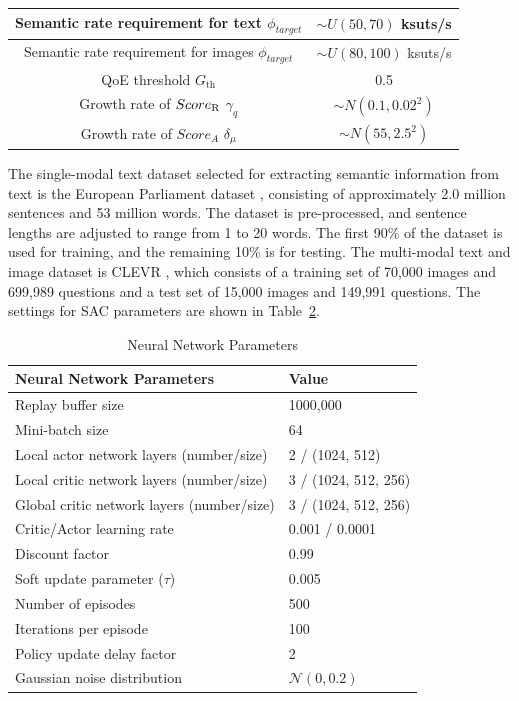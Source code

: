 \documentclass[10pt, lettersize,journal]{IEEEtran}
\begin{document}
\begin{table}[t]
\begin{center}
\begin{tabular}{|c|c|}
				Semantic rate requirement for text \( {\phi _{target}} \) & \( \sim U(50, 70) \) ksuts/s \\ \hline
				Semantic rate requirement for images \( {\phi _{target}} \) & \( \sim U(80, 100) \) ksuts/s \\ \hline
				QoE threshold \( G_{\text{th}} \) & 0.5 \\ \hline
				Growth rate of $Scor{e_{\rm{R}}}$ \( {\gamma _q} \) & \( \sim N(0.1, 0.02^2) \) \\ \hline
				Growth rate of $Scor{e_A}$ \( {\delta _\mu } \) & \( \sim N(55, 2.5^2) \) \\ \hline
			\end{tabular}
			\label{tab:vehicular_parameters}
		\end{center}
	\end{table}
	
	The single-modal text dataset selected for extracting semantic information from text is the European Parliament dataset \cite{RN91}, consisting of approximately 2.0 million sentences and 53 million words.
	The dataset is pre-processed, and sentence lengths are adjusted to range from 1 to 20 words. The first 90\% of the dataset is used for training, and the remaining 10\% is for testing.
	The multi-modal text and image dataset is CLEVR \cite{CLEVR}, which consists of a
	training set of 70,000 images and 699,989 questions and a test
	set of 15,000 images and 149,991 questions.
	The settings for SAC parameters are shown in Table~\ref{tab:neural_network_parameters}.
	\begin{table}[htbp]
		\centering
		\caption{Neural Network Parameters}
		\begin{tabular}{|l|l|}
			\hline
			\textbf{Neural Network Parameters} & \textbf{Value} \\ \hline
			Replay buffer size & 1000,000 \\ \hline
			Mini-batch size & 64 \\ \hline
			Local actor network layers (number/size) & 2 / (1024, 512) \\ \hline
			Local critic network layers (number/size) & 3 / (1024, 512, 256) \\ \hline
			Global critic network layers (number/size) & 3 / (1024, 512, 256) \\ \hline
			Critic/Actor learning rate & 0.001 / 0.0001 \\ \hline
			Discount factor & 0.99 \\ \hline
			Soft update parameter (\( \tau \)) & 0.005 \\ \hline
			Number of episodes & 500 \\ \hline
			Iterations per episode & 100 \\ \hline
			Policy update delay factor & 2 \\ \hline
			Gaussian noise distribution & \( \mathcal{N}(0, 0.2) \) \\ \hline
		\end{tabular}
		\label{tab:neural_network_parameters}
	\end{table}
	\vspace{-0.8cm}
\end{document}
